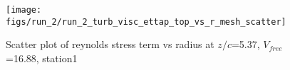 \begin{figure}[H]
\centering
\texttt{[image: figs/run\_2/run\_2\_turb\_visc\_ettap\_top\_vs\_r\_mesh\_scatter]}
\caption{Scatter plot of reynolds stress term vs radius at $z/c$=5.37, $V_{free}$=16.88, station1}
\label{fig:run_2_turb_visc_ettap_top_vs_r_mesh_scatter}
\end{figure}


